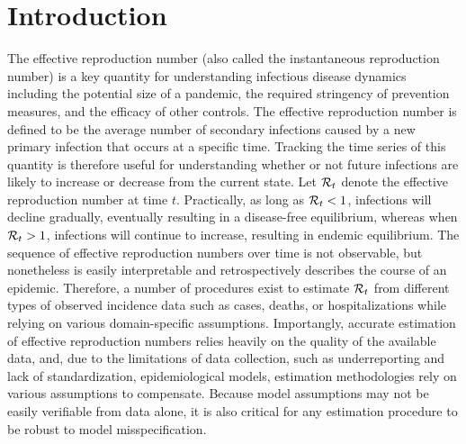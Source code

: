 \section{Introduction}
\label{sec:intro}

The effective reproduction number (also called the instantaneous reproduction
number) is a key quantity for understanding infectious disease dynamics including
the potential size of a pandemic, the required stringency of prevention measures,
and the efficacy of other controls. 
The effective reproduction number is defined to be the average number of
secondary infections caused by a new primary infection that occurs at a specific
time. Tracking the time series of this quantity
is therefore useful for understanding whether or not future infections are
likely to increase or decrease from the current state.
Let $\mathcal{R}_t$ denote the effective reproduction number at time $t$. Practically,
as long as $\mathcal{R}_t < 1$, infections will decline gradually, eventually
resulting in a disease-free equilibrium, whereas when $\mathcal{R}_t
> 1$, infections will continue to increase, resulting in endemic
equilibrium. 
%
The sequence of effective reproduction numbers over time is not observable, but
nonetheless is easily interpretable and retrospectively describes the course of
an epidemic. Therefore, a number of procedures exist to estimate $\mathcal{R}_t$ from
different types of observed incidence data such as cases, deaths, or
hospitalizations while relying on various domain-specific assumptions.
Importangly, accurate estimation of effective reproduction numbers relies
heavily on the quality of the available data, and, due to the limitations of
data collection, such as underreporting and lack of standardization,
epidemiological models, estimation methodologies rely on various assumptions to
compensate. Because model assumptions may not be easily verifiable from data
alone, it is also critical for any estimation procedure to be robust to model
misspecification. 

